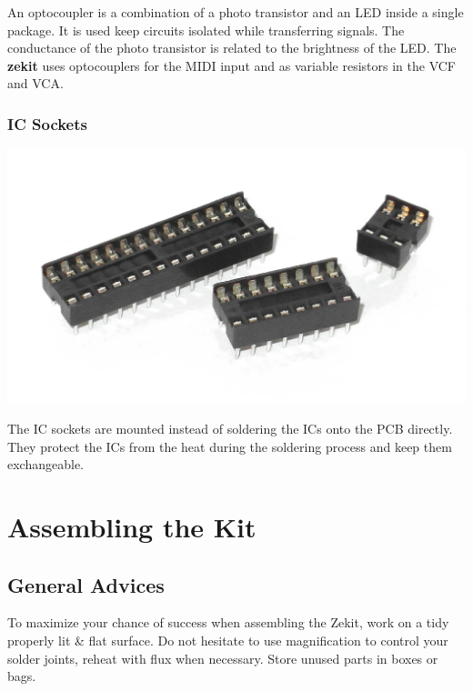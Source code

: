 \documentclass{scrartcl}
\begin{document}
An optocoupler is a combination of a photo transistor and an LED inside a single package. It is used keep circuits isolated while transferring signals. The conductance of the photo transistor is related to the brightness of the LED. The \textbf{zekit} uses optocouplers for the MIDI input and as variable resistors in the VCF and VCA.

\subsubsection{IC Sockets}

\begin{center}
    \includegraphics[scale=0.15]{assets/zekit-sockets.jpg}
\end{center}

The IC sockets are mounted instead of soldering the ICs onto the PCB directly. They protect the ICs from the heat during the soldering process and keep them exchangeable.

\pagebreak


\section{Assembling the Kit}

\subsection{General Advices}

To maximize your chance of success when assembling the Zekit, work on a tidy properly lit \& flat surface. Do not hesitate to use magnification to control your solder joints, reheat with flux when necessary. Store unused parts in boxes or bags.
\end{document}
